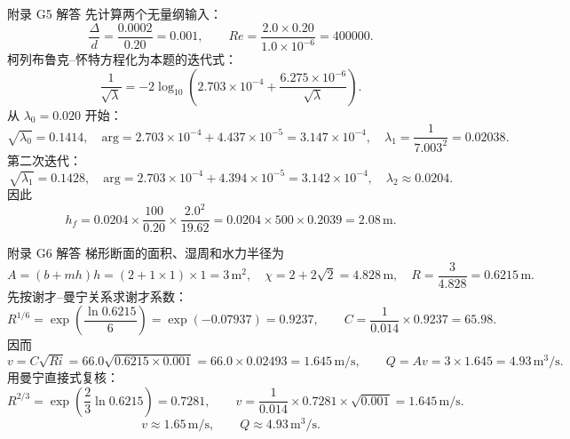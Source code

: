 \documentclass[aspectratio=169,10pt]{beamer}
\newcommand{\Rey}{\mathit{Re}}
\begin{document}
\begin{frame}{附录 G5 解答}
  \footnotesize
  \setlength{\abovedisplayskip}{3pt}
  \setlength{\belowdisplayskip}{3pt}
  先计算两个无量纲输入：
  \[
    \frac{\Delta}{d}=\frac{0.0002}{0.20}=0.001,\qquad
    \Rey=\frac{2.0\times0.20}{1.0\times10^{-6}}=400000.
    \tag{H58}
  \]
  柯列布鲁克--怀特方程化为本题的迭代式：
  \[
    \frac{1}{\sqrt{\lambda}}
    =
    -2\log_{10}
    \left(2.703\times10^{-4}
    +
    \frac{6.275\times10^{-6}}{\sqrt{\lambda}}\right).
    \tag{H59}
  \]
  从 $\lambda_0=0.020$ 开始：
  \[
    \sqrt{\lambda_0}=0.1414,\quad
    \text{arg}=2.703\times10^{-4}+4.437\times10^{-5}=3.147\times10^{-4},
    \quad
    \lambda_1=\frac{1}{7.003^2}=0.02038 .
    \tag{H60}
  \]
  第二次迭代：
  \[
    \sqrt{\lambda_1}=0.1428,\quad
    \text{arg}=2.703\times10^{-4}+4.394\times10^{-5}=3.142\times10^{-4},
    \quad
    \lambda_2\approx0.0204 .
    \tag{H61}
  \]
  因此
  \[
    h_f
    =
    0.0204\times\frac{100}{0.20}\times\frac{2.0^2}{19.62}
    =
    0.0204\times500\times0.2039
    =
    \boxed{2.08\,\mathrm m}.
    \tag{H62}
  \]
\end{frame}

\begin{frame}{附录 G6 解答}
  \footnotesize
  \setlength{\abovedisplayskip}{3pt}
  \setlength{\belowdisplayskip}{3pt}
  梯形断面的面积、湿周和水力半径为
  \[
    A=(b+mh)h=(2+1\times1)\times1=3\,\mathrm{m^2},
    \quad
    \chi=2+2\sqrt2=4.828\,\mathrm m,
    \quad
    R=\frac{3}{4.828}=0.6215\,\mathrm m .
    \tag{H63}
  \]
  先按谢才--曼宁关系求谢才系数：
  \[
    R^{1/6}
    =
    \exp\!\left(\frac{\ln0.6215}{6}\right)
    =
    \exp(-0.07937)
    =
    0.9237,\qquad
    C=\frac{1}{0.014}\times0.9237=65.98 .
    \tag{H64}
  \]
  因而
  \[
    v=C\sqrt{Ri}
    =
    66.0\sqrt{0.6215\times0.001}
    =
    66.0\times0.02493
    =
    1.645\,\mathrm{m/s},
    \qquad
    Q=Av=3\times1.645=4.93\,\mathrm{m^3/s}.
    \tag{H65}
  \]
  用曼宁直接式复核：
  \[
    R^{2/3}
    =
    \exp\!\left(\frac{2}{3}\ln0.6215\right)
    =
    0.7281,\qquad
    v=\frac{1}{0.014}\times0.7281\times\sqrt{0.001}
    =
    1.645\,\mathrm{m/s}.
    \tag{H66}
  \]
  \[
    \boxed{v\approx1.65\,\mathrm{m/s},\qquad Q\approx4.93\,\mathrm{m^3/s}.}
  \]
\end{frame}
\end{document}
